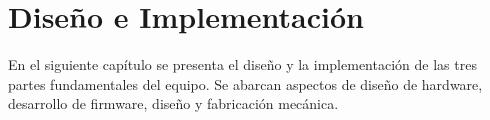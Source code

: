 
\chapter{Diseño e Implementación} %

\label{Chapter3} %
En el siguiente capítulo se presenta el diseño y la implementación de las tres partes fundamentales del equipo. Se abarcan aspectos de diseño de hardware, desarrollo de firmware, diseño y fabricación mecánica.

